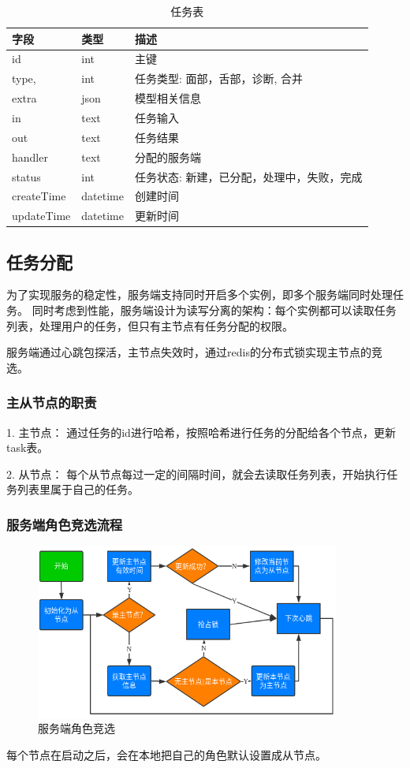 \begin{table}[]
    \centering
    \begin{tabular}{lll}
        \toprule
        字段 & 类型 & 描述 \\ 
        \midrule
        id & int & 主键 \\
        type, & int & 任务类型: 面部，舌部，诊断, 合并 \\ 
        extra & json & 模型相关信息 \\
        in & text & 任务输入 \\
        out & text & 任务结果 \\
        handler & text & 分配的服务端 \\
        status & int & 任务状态: 新建，已分配，处理中，失败，完成 \\
        createTime & datetime & 创建时间 \\
        updateTime & datetime & 更新时间\\
        \bottomrule
    \end{tabular}
    \caption{任务表}
    \label{tab:task}
\end{table}

\subsection{任务分配}
为了实现服务的稳定性，服务端支持同时开启多个实例，即多个服务端同时处理任务。
同时考虑到性能，服务端设计为读写分离的架构：每个实例都可以读取任务列表，处理用户的任务，但只有主节点有任务分配的权限。

服务端通过心跳包探活，主节点失效时，通过redis的分布式锁实现主节点的竞选。


\subsubsection{主从节点的职责}

1. 主节点： 通过任务的id进行哈希，按照哈希进行任务的分配给各个节点，更新task表。

2. 从节点： 每个从节点每过一定的间隔时间，就会去读取任务列表，开始执行任务列表里属于自己的任务。

\subsubsection{服务端角色竞选流程}
\begin{figure}
    \centering
    \includegraphics[width=10cm]{images/slave-master.png}
    \caption{服务端角色竞选}
    \label{fig:slave_master}
\end{figure}
每个节点在启动之后，会在本地把自己的角色默认设置成从节点。


